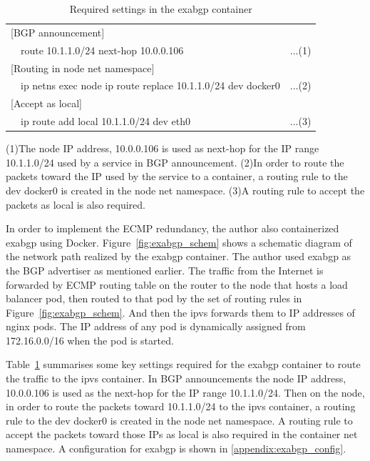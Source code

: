 \begin{table}
  \begin{center}
    \begin{tabular}{lllr}
      \hline 
      \multicolumn{4}{l}{[BGP announcement]} \\
      \hspace{15 mm} & \multicolumn{2}{l}{route 10.1.1.0/24 next-hop 10.0.0.106} & ...(1) \\
      \multicolumn{4}{l}{[Routing in node net namespace]} \\
      \hspace{15 mm} & \multicolumn{2}{l}{ip netns exec node ip route replace 10.1.1.0/24 dev docker0} & ...(2) \\
      \multicolumn{4}{l}{[Accept as local]} \\
      \hspace{15 mm} & \multicolumn{2}{l}{ip route add local 10.1.1.0/24 dev eth0} & ...(3) \\
      \hline
    \end{tabular}
    \caption{Required settings in the exabgp container}
    \label{table:exabgp_setting}
  
    \parbox[c]{0.9\columnwidth}{
      (1)The node IP address, 10.0.0.106 is used as next-hop for the IP range 10.1.1.0/24 used by a service in BGP announcement.
      (2)In order to route the packets toward the IP used by the service to a container, a routing rule to the dev docker0 is created in the node net namespace.
      (3)A routing rule to accept the packets as local is also required. 
    }
  \end{center}
\end{table}

In order to implement the ECMP redundancy, the author also containerized exabgp using Docker.
Figure~\ref{fig:exabgp_schem} shows a schematic diagram of the network path realized by the exabgp container.
The author used exabgp as the BGP advertiser as mentioned earlier.
The traffic from the Internet is forwarded by ECMP routing table on the router to the node that hosts a load balancer pod, then routed to that pod by the set of routing rules in Figure~\ref{fig:exabgp_schem}.
And then the ipvs forwards them to IP addresses of nginx pods.
The IP address of any pod is dynamically assigned from 172.16.0.0/16 when the pod is started. 

Table~\ref{table:exabgp_setting} summarises some key settings required for the exabgp container to route the traffic to the ipvs container.
In BGP announcements the node IP address, 10.0.0.106 is used as the next-hop for the IP range 10.1.1.0/24.
Then on the node, in order to route the packets toward 10.1.1.0/24 to the ipvs container, 
a routing rule to the dev docker0 is created in the node net namespace. 
A routing rule to accept the packets toward those IPs as local is also required in the container net namespace. 
A configuration for exabgp is shown in \ref{appendix:exabgp_config}.

